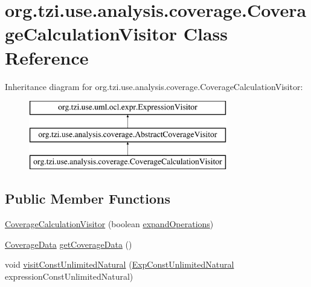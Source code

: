 \hypertarget{classorg_1_1tzi_1_1use_1_1analysis_1_1coverage_1_1_coverage_calculation_visitor}{\section{org.\-tzi.\-use.\-analysis.\-coverage.\-Coverage\-Calculation\-Visitor Class Reference}
\label{classorg_1_1tzi_1_1use_1_1analysis_1_1coverage_1_1_coverage_calculation_visitor}
}
Inheritance diagram for org.\-tzi.\-use.\-analysis.\-coverage.\-Coverage\-Calculation\-Visitor\-:\begin{figure}[H]
\begin{center}
\leavevmode
\includegraphics[height=3.000000cm]{classorg_1_1tzi_1_1use_1_1analysis_1_1coverage_1_1_coverage_calculation_visitor}
\end{center}
\end{figure}
\subsection*{Public Member Functions}
\begin{DoxyCompactItemize}
\item 
\hyperlink{classorg_1_1tzi_1_1use_1_1analysis_1_1coverage_1_1_coverage_calculation_visitor_ae67c9074b0d1ae3b31c14bcbf91a59a0}{Coverage\-Calculation\-Visitor} (boolean \hyperlink{classorg_1_1tzi_1_1use_1_1analysis_1_1coverage_1_1_abstract_coverage_visitor_a2686463cc149dcb3cfc8c1efb80a69c2}{expand\-Operations})
\item 
\hyperlink{classorg_1_1tzi_1_1use_1_1analysis_1_1coverage_1_1_coverage_data}{Coverage\-Data} \hyperlink{classorg_1_1tzi_1_1use_1_1analysis_1_1coverage_1_1_coverage_calculation_visitor_ab47653f40910dcf0e4640b04cb0d9f04}{get\-Coverage\-Data} ()
\item 
void \hyperlink{classorg_1_1tzi_1_1use_1_1analysis_1_1coverage_1_1_coverage_calculation_visitor_ac4694cee9120f0fd49bba3096662d124}{visit\-Const\-Unlimited\-Natural} (\hyperlink{classorg_1_1tzi_1_1use_1_1uml_1_1ocl_1_1expr_1_1_exp_const_unlimited_natural}{Exp\-Const\-Unlimited\-Natural} expression\-Const\-Unlimited\-Natural)
\end{DoxyCompactItemize}

